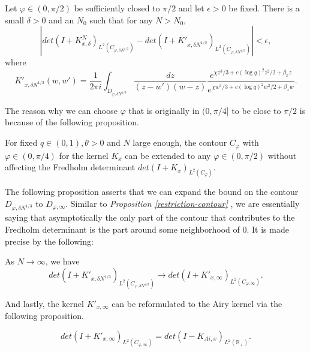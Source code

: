 \begin{proposition} 
Let $\varphi \in (0, \pi / 2)$ be sufficiently closed to $\pi / 2$ and let $\epsilon > 0$ be fixed. There is a small $\delta > 0$ and an $N_0$ such that for any $N > N_0$, $$|det(I +K_{x, \delta}^N )_{L^2(C_{\varphi, \delta N^{1/3}})} - det(I + K'_{x, \delta N^{1/3}})_{L^2(C_{\varphi, \delta N^{1/3}})}| < \epsilon,$$ where $$K'_{x,\delta N^{1/3}}(w,w') = \frac{1}{2 \pi i} \int_{D_{\varphi, \delta N^{1/3}}} \frac{dz}{(z-w')(w-z)} \frac{e^{\chi z^3 / 3 + c (\log q)^2 z^2 / 2 + \beta_x z}}{e^{\chi w^3 / 3 + c (\log q)^2 w^2 / 2 + \beta_x w}}.$$
\end{proposition}

The reason why we can choose $\varphi$ that is originally in $(0, \pi / 4]$ to be close to $\pi / 2$ is because of the following proposition.
\begin{proposition} 
For fixed $q \in (0,1), \theta > 0$ and $N$ large enough, the contour $C_{\varphi}$ with $\varphi \in (0, \pi / 4)$ for the kernel $K_x$ can be extended to any $\varphi \in (0, \pi / 2)$ without affecting the Fredholm determinant $det(I+K_x)_{L^2(C_{\varphi})}$.
\end{proposition}

The following proposition asserts that we can expand the bound on the contour $D_{\varphi, \delta N^{1/3}}$ to $D_{\varphi, \infty}$. Similar to \textit{Proposition \ref{restriction-contour} }, we are essentially saying that asymptotically the only part of the contour that contributes to the Fredholm determinant is the part around some neighborhood of $0$. It is made precise by the following:

\begin{proposition} 
As $N \rightarrow \infty$, we have $$det(I+K'_{x, \delta N^{1/3}})_{L^2(C_{\varphi, \delta N^{1/3}})} \rightarrow det(I+K'_{x, \infty})_{L^2(C_{\varphi, \infty})}.$$
\end{proposition}

And lastly, the kernel $K'_{x, \infty}$ can be reformulated to the Airy kernel via the following proposition.
\begin{proposition} 

$$det(I+K'_{x,\infty})_{L^2(C_{\varphi, \infty})} = det(I - K_{Ai, x})_{L^2(\mathbb{R}_+)}.$$
\end{proposition}

